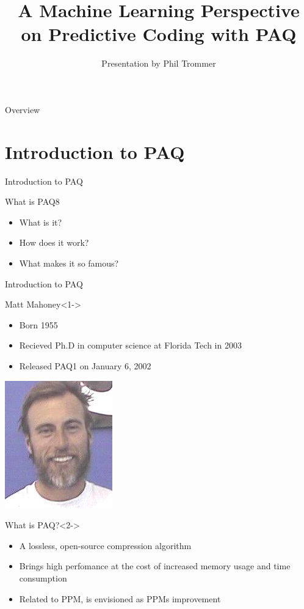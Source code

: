 \documentclass[11pt,usenames,dvipsnames]{beamer}
\author{Presentation by Phil Trommer}
\title{A Machine Learning Perspective on Predictive Coding with PAQ}
\begin{document}
\begin{frame}
\titlepage
\end{frame}


\begin{frame}{Overview}
\tableofcontents
\end{frame}


\section{Introduction to PAQ}


\begin{frame}{Introduction to PAQ}
	\begin{block}{What is PAQ8}
			\begin{itemize}
				\item What is it?
				\item How does it work?
				\item What makes it so famous?
			\end{itemize}
	\end{block}
\end{frame}

\begin{frame}{Introduction to PAQ}
	\begin{exampleblock}{Matt Mahoney}<1->
	\begin{minipage}[b]{0.70\linewidth}
		\begin{itemize}
			\item Born 1955
			\item Recieved Ph.D in computer science at Florida Tech in 2003
			\item Released PAQ1 on January 6, 2002
		\end{itemize}
	\hfill
	\end{minipage}
	\begin{minipage}[b]{0.28\linewidth}
		\includegraphics[scale=1.5]{files/matt.jpg}
	\end{minipage}
	\end{exampleblock}
	
	\begin{alertblock}{What is PAQ?}<2->
		\begin{itemize}
			\item A lossless, open-source compression algorithm
			\item Brings high perfomance at the cost of increased memory usage and time consumption
			\item Related to PPM, is envisioned as PPMs improvement
		\end{itemize}
	\end{alertblock}
\end{frame}
\end{document}
